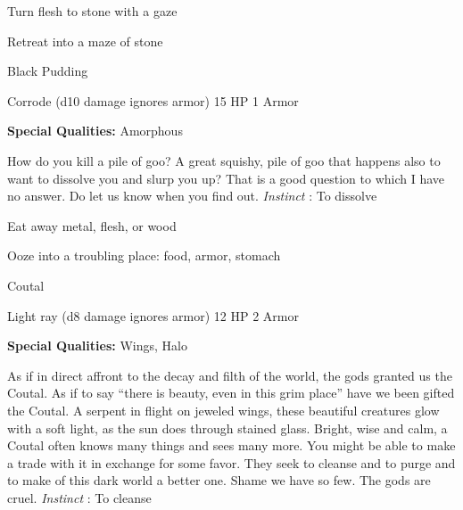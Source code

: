 \startitemize[1,packed]

\item Turn flesh to stone with a gaze

 
\item Retreat into a maze of stone


\stopitemize
 
\startMonsterName
Black Pudding	 
\stopMonsterName
 

Corrode (d10 damage ignores armor)	15 HP	1 Armor

 


 
\startMonsterQualities
{\bf Special Qualities:}  Amorphous
\stopMonsterQualities
 
\startMonsterDescription
How do you kill a pile of goo? A great squishy, pile of goo that happens also to want to dissolve you and slurp you up? That is a good question to which I have no answer. Do let us know when you find out. {\em Instinct} : To dissolve
\stopMonsterDescription
 
\startitemize[1,packed]

\item Eat away metal, flesh, or wood

 
\item Ooze into a troubling place: food, armor, stomach


\stopitemize
 
\startMonsterName
Coutal	 
\stopMonsterName
 

Light ray (d8 damage ignores armor)	12 HP	2 Armor

 


 
\startMonsterQualities
{\bf Special Qualities:}  Wings, Halo
\stopMonsterQualities
 
\startMonsterDescription
As if in direct affront to the decay and filth of the world, the gods granted us the Coutal. As if to say “there is beauty, even in this grim place” have we been gifted the Coutal. A serpent in flight on jeweled wings, these beautiful creatures glow with a soft light, as the sun does through stained glass. Bright, wise and calm, a Coutal often knows many things and sees many more. You might be able to make a trade with it in exchange for some favor. They seek to cleanse and to purge and to make of this dark world a better one. Shame we have so few. The gods are cruel. {\em Instinct} : To cleanse
\stopMonsterDescription
 

